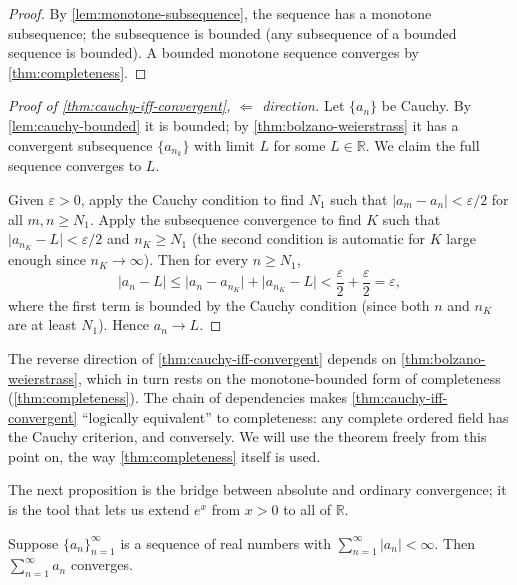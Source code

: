 \begin{proof}
By \cref{lem:monotone-subsequence}, the sequence has a monotone subsequence; the subsequence is bounded (any subsequence of a bounded sequence is bounded). A bounded monotone sequence converges by \cref{thm:completeness}.
\end{proof}

\begin{proof}[Proof of \cref{thm:cauchy-iff-convergent}, \(\Leftarrow\) direction]
Let \(\{a_{n}\}\) be Cauchy. By \cref{lem:cauchy-bounded} it is bounded; by \cref{thm:bolzano-weierstrass} it has a convergent subsequence \(\{a_{n_{k}}\}\) with limit \(L\) for some \(L \in \mathbb{R}\). We claim the full sequence converges to \(L\).

Given \(\varepsilon > 0\), apply the Cauchy condition to find \(N_{1}\) such that \(\lvert a_{m} - a_{n} \rvert < \varepsilon / 2\) for all \(m, n \geq N_{1}\). Apply the subsequence convergence to find \(K\) such that \(\lvert a_{n_{K}} - L \rvert < \varepsilon / 2\) and \(n_{K} \geq N_{1}\) (the second condition is automatic for \(K\) large enough since \(n_{K} \to \infty\)). Then for every \(n \geq N_{1}\),
\[
\lvert a_{n} - L \rvert
\leq \lvert a_{n} - a_{n_{K}} \rvert + \lvert a_{n_{K}} - L \rvert
< \frac{\varepsilon}{2} + \frac{\varepsilon}{2}
= \varepsilon,
\]
where the first term is bounded by the Cauchy condition (since both \(n\) and \(n_{K}\) are at least \(N_{1}\)). Hence \(a_{n} \to L\).
\end{proof}

\begin{caution}
The reverse direction of \cref{thm:cauchy-iff-convergent} depends on \cref{thm:bolzano-weierstrass}, which in turn rests on the monotone-bounded form of completeness (\cref{thm:completeness}). The chain of dependencies makes \cref{thm:cauchy-iff-convergent} ``logically equivalent'' to completeness: any complete ordered field has the Cauchy criterion, and conversely. We will use the theorem freely from this point on, the way \cref{thm:completeness} itself is used.
\end{caution}

The next proposition is the bridge between absolute and ordinary convergence; it is the tool that lets us extend \(e^{x}\) from \(x > 0\) to all of \(\mathbb{R}\).

\begin{proposition}\label{prop:abs-conv-implies-conv}
Suppose \(\{a_{n}\}_{n = 1}^{\infty}\) is a sequence of real numbers with \(\sum_{n = 1}^{\infty} \lvert a_{n} \rvert < \infty\). Then \(\sum_{n = 1}^{\infty} a_{n}\) converges.
\end{proposition}

